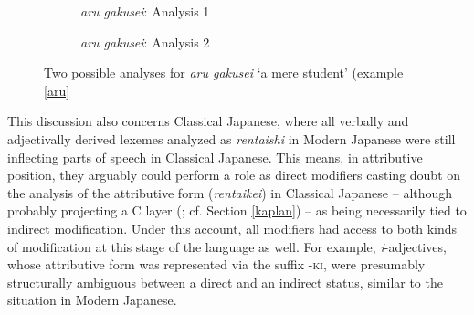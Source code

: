 \begin{figure}

\begin{subfigure}{\textwidth}
\centering
{}
\caption{\textit{aru gakusei}: Analysis 1}
\label{aru gakusei analysis 1}
\end{subfigure}

\begin{subfigure}{\textwidth}
\centering
{}
\caption{\textit{aru gakusei}: Analysis 2}
\label{aru gakusei analysis 2}
\end{subfigure}

\caption{Two possible analyses for \textit{aru gakusei} `a mere student’ (example \ref{aru}}
\label{analyses for aru gakusei}

\end{figure}

\largerpage[2]
This discussion also concerns Classical Japanese, where all verbally and adjectivally derived lexemes analyzed as \textit{rentaishi} in Modern Japanese were still inflecting parts of speech in Classical Japanese. This means, in attributive position, they arguably could perform a role as direct modifiers casting doubt on the analysis of the attributive form (\textit{rentaikei}) in Classical Japanese -- although probably projecting a C layer (\citealt{kinsui:1995:iwayuru, kaplan:1995:the, hiraiwa:2005:dimensions}; cf. Section \ref{kaplan}) -- as being necessarily tied to indirect modification. Under this account, all modifiers had access to both kinds of modification at this stage of the language as well. For example, \textit{i}-adjectives, whose attributive form was represented via the suffix -\textsc{ki}, were presumably structurally ambiguous between a direct and an indirect status, similar to the situation in Modern Japanese. 

